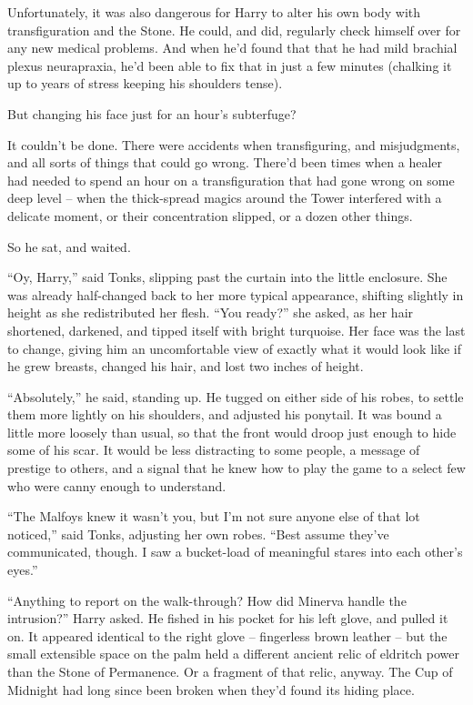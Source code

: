 Unfortunately, it was also dangerous for Harry to alter his own body
with transfiguration and the Stone. He could, and did, regularly check
himself over for any new medical problems. And when he'd found that that
he had mild brachial plexus neurapraxia, he'd been able to fix that in
just a few minutes (chalking it up to years of stress keeping his
shoulders tense).

But changing his face just for an hour's subterfuge?

It couldn't be done. There were accidents when transfiguring, and
misjudgments, and all sorts of things that could go wrong. There'd been
times when a healer had needed to spend an hour on a transfiguration
that had gone wrong on some deep level -- when the thick-spread magics
around the Tower interfered with a delicate moment, or their
concentration slipped, or a dozen other things.

So he sat, and waited.

``Oy, Harry,'' said Tonks, slipping past the curtain into the little
enclosure. She was already half-changed back to her more typical
appearance, shifting slightly in height as she redistributed her flesh.
``You ready?'' she asked, as her hair shortened, darkened, and tipped
itself with bright turquoise. Her face was the last to change, giving
him an uncomfortable view of exactly what it would look like if he grew
breasts, changed his hair, and lost two inches of height.

``Absolutely,'' he said, standing up. He tugged on either side of his
robes, to settle them more lightly on his shoulders, and adjusted his
ponytail. It was bound a little more loosely than usual, so that the
front would droop just enough to hide some of his scar. It would be less
distracting to some people, a message of prestige to others, and a
signal that he knew how to play the game to a select few who were canny
enough to understand.

``The Malfoys knew it wasn't you, but I'm not sure anyone else of that
lot noticed,'' said Tonks, adjusting her own robes. ``Best assume
they've communicated, though. I saw a bucket-load of meaningful stares
into each other's eyes.''

``Anything to report on the walk-through? How did Minerva handle the
intrusion?'' Harry asked. He fished in his pocket for his left glove,
and pulled it on. It appeared identical to the right glove -- fingerless
brown leather -- but the small extensible space on the palm held a
different ancient relic of eldritch power than the Stone of Permanence.
Or a fragment of that relic, anyway. The Cup of Midnight had long since
been broken when they'd found its hiding place.


